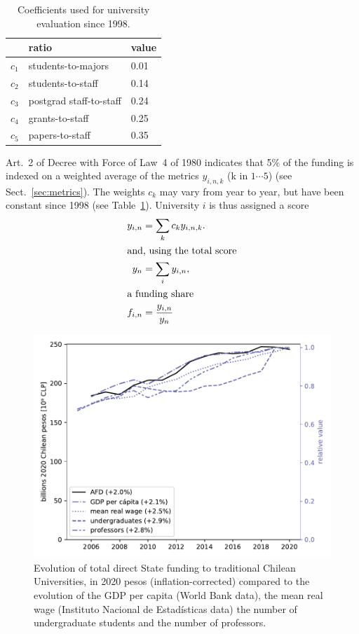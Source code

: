 \documentclass[twocolumn]{article}
\begin{document}
\begin{table}[t]
\centering
\caption{Coefficients used for university evaluation since 1998.}
\label{tab:coeff}
\begin{tabular}{lll}
\hline\hline
      & ratio                   & value\\
\hline
$c_1$ & students-to-majors      & 0.01\\
$c_2$ & students-to-staff       & 0.14\\
$c_3$ & postgrad staff-to-staff & 0.24\\
$c_4$ & grants-to-staff         & 0.25\\
$c_5$ & papers-to-staff         & 0.35\\
\hline
\end{tabular}
\end{table}


Art.~2 of Decree with Force of Law~4 of 1980 indicates that 5\% of the funding
is indexed on a weighted average of the metrics $y_{i,n,k}$ (k in $1\cdots5$)
(see Sect.~\ref{sec:metrics}). The weights $c_k$ may vary from year to year,
but have been constant since 1998 (see Table~\ref{tab:coeff}).  University $i$
is thus assigned a score
\begin{subequations}
\begin{align}
    y_{i,n}    &= \sum_k c_k y_{i,n,k}. \label{eq:y}\\
\intertext{and, using the total score}
    y_{n}      &= \sum_i y_{i,n},\\
\intertext{a funding share}
    f_{i,n}    &= \frac{y_{i,n}}{y_{n}} \label{eq:f}
\end{align}
\end{subequations}


\begin{figure}[t]
\centering
\includegraphics[width=\linewidth]{pdf/total-afd-timeseries.pdf}
\caption{Evolution of total direct State funding to traditional Chilean Universities, in 2020 pesos (inflation-corrected) compared to the evolution of the GDP per capita (World Bank data), the mean real wage (Instituto Nacional de Estadísticas data) the number of undergraduate students and the number of professors.}
\label{fig:total-afd}
\end{figure}
\end{document}
